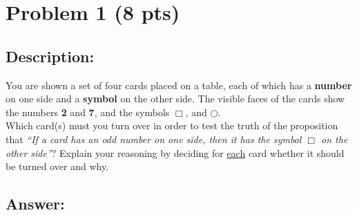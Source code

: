 \newpage

\section{Problem 1 (8 pts)}
\subsection{Description:}

\noindent You are shown a set of four cards placed on a table, each of which has a \textbf{number} on one side and a \textbf{symbol} on the other side. The visible faces of the cards show the numbers \textbf{2} and \textbf{7}, and the symbols \textbf{$\Box$}, and \textbf{$\bigcirc$}.\\

\noindent Which card(s) must you turn over in order to test the truth of the proposition that \textit{``If a card has an odd number on one side, then it has the symbol $\Box$ on the other side''}? Explain your reasoning by deciding for \underline{each} card whether it should be turned over and why.\\

\subsection{Answer:}


